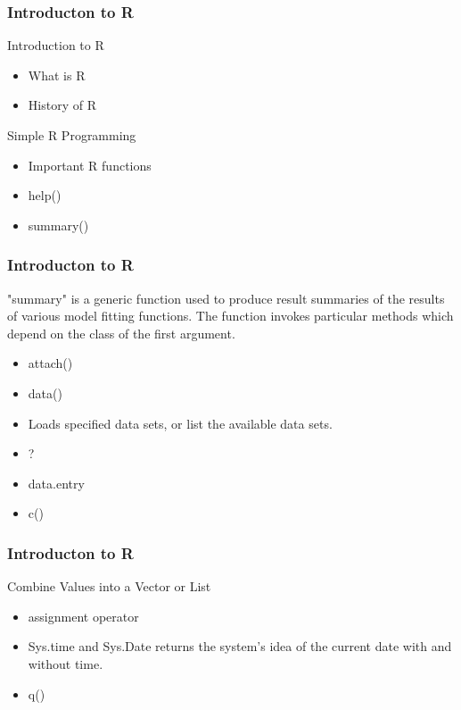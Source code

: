\documentclass{beamer}
\begin{document}
\begin{frame}[fragile]
\frametitle{Introducton to R}

Introduction to R
\begin{itemize}
 \item  What is R
 \item  History of R
\end{itemize}

Simple R Programming
\begin{itemize}
 \item  Important R functions
  \item  help()
  \item  summary()
  
\end{itemize}

  
\end{frame}
\begin{frame}[fragile]
\frametitle{Introducton to R}

"summary" is a generic function used to produce result summaries of the results of various model fitting functions. 
The function invokes particular methods which depend on the class of the first argument. 
\begin{itemize}
  \item  attach()
  \item  data()
   \item  Loads specified data sets, or list the available data sets. 
  \item  ?
  \item  data.entry
  \item  c()

\end{itemize}

\end{frame}
\begin{frame}[fragile]
\frametitle{Introducton to R}


Combine Values into a Vector or List
\begin{itemize}
  \item  assignment operator
  \item  Sys.time and Sys.Date returns the system's idea of the current date with and without time. 
  \item  q()

\end{itemize}


\end{frame}
\end{document}
